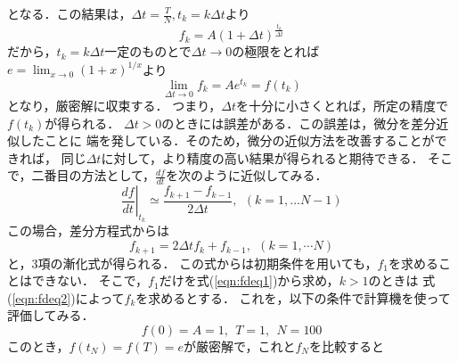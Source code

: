\documentclass[10pt,a4j,dvipdfmx]{jarticle}
\begin{document}
となる．この結果は，$\Delta t= \frac{T}{N}, t_k=k\Delta t$より
\begin{equation}
	f_k=A\left(1+ \Delta t\right)^{\frac{t_k}{\Delta t}}
	\label{eqn:}
\end{equation}
だから，$t_k=k\Delta t$一定のものとで$\Delta t \rightarrow 0$の極限をとれば
$e=\lim_{x\rightarrow 0}(1+x)^{1/x}$より
\begin{equation}
	\lim _{\Delta t \rightarrow 0}f_k=Ae^{t_k}=f(t_k)
	\label{eqn:}
\end{equation}
となり，厳密解に収束する． 
つまり，$\Delta t$を十分に小さくとれば，所定の精度で$f(t_k)$が得られる．
$\Delta t>0$のときには誤差がある．この誤差は，微分を差分近似したことに
端を発している．そのため，微分の近似方法を改善することができれば，
同じ$\Delta t$に対して，より精度の高い結果が得られると期待できる．
そこで，二番目の方法として，$\frac{df}{dt}$を次のように近似してみる．
\begin{equation}
	\left. \frac{df}{dt} \right|_{t_k} \simeq 
	\frac{f_{k+1}-f_{k-1}}{2\Delta t}, \ \ (k=1,\dots N-1)
	\label{eqn:fd_2nd}
\end{equation}
この場合，差分方程式からは
\begin{equation}
	f_{k+1}= 2\Delta t f_k +f_{k-1}, \ \ (k=1,\cdots N)
	\label{eqn:fdeq2}
\end{equation}
と，3項の漸化式が得られる．
この式からは初期条件を用いても，$f_1$を求めることはできない．
そこで，$f_1$だけを式(\ref{eqn:fdeq1})から求め，$k>1$のときは
式(\ref{eqn:fdeq2})によって$f_k$を求めるとする．
これを，以下の条件で計算機を使って評価してみる．
\[
	f(0)=A=1, \ \ T=1, \ \ N=100
\]
このとき，$f(t_N)=f(T)=e$が厳密解で，これと$f_N$を比較すると
\end{document}
